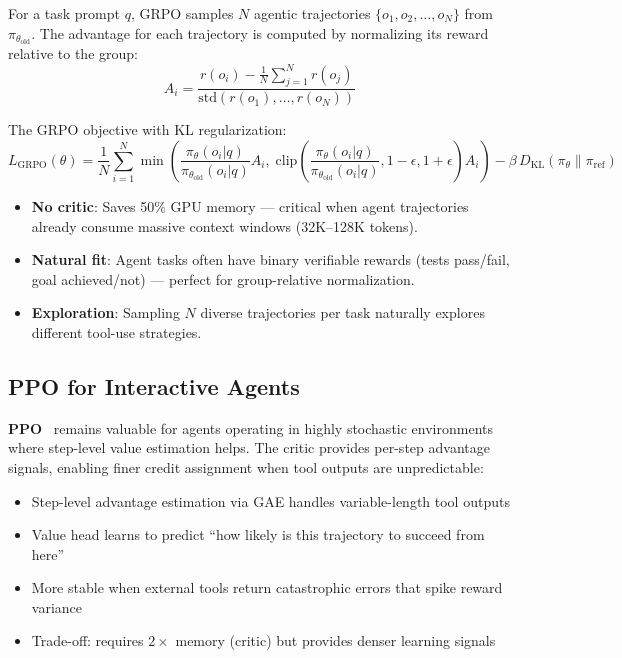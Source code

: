 For a task prompt $q$, GRPO samples $N$ agentic trajectories $\{o_1, o_2, \dots, o_N\}$ from $\pi_{\theta_{\text{old}}}$. The advantage for each trajectory is computed by normalizing its reward relative to the group: 
\begin{equation}
\boxed{A_i = \frac{r(o_i) - \frac{1}{N}\sum_{j=1}^N r(o_j)}{\text{std}(r(o_1), \dots, r(o_N))}}
\end{equation}

The GRPO objective with KL regularization: 
\begin{equation}
L_{\text{GRPO}}(\theta) = \frac{1}{N} \sum_{i=1}^N \min\!\left( \frac{\pi_\theta(o_i|q)}{\pi_{\theta_{\text{old}}}(o_i|q)} A_i,\; \text{clip}\!\left(\frac{\pi_\theta(o_i|q)}{\pi_{\theta_{\text{old}}}(o_i|q)}, 1{-}\epsilon, 1{+}\epsilon\right) A_i \right) - \beta\, D_{\text{KL}}(\pi_\theta \| \pi_{\text{ref}})
\end{equation}

\begin{intuitionbox}
\begin{itemize}
  \item \textbf{No critic}: Saves 50\% GPU memory --- critical when agent trajectories already consume massive context windows (32K--128K tokens).
  \item \textbf{Natural fit}: Agent tasks often have binary verifiable rewards (tests pass/fail, goal achieved/not) --- perfect for group-relative normalization.
  \item \textbf{Exploration}: Sampling $N$ diverse trajectories per task naturally explores different tool-use strategies.
\end{itemize}
\end{intuitionbox}

\subsection{PPO for Interactive Agents}
\label{ppo-for-interactive-agents}

\textbf{PPO}~\cite{schulman2017proximal} remains valuable for agents operating in highly stochastic environments where step-level value estimation helps. The critic provides per-step advantage signals, enabling finer credit assignment when tool outputs are unpredictable:

\begin{itemize}
  \item Step-level advantage estimation via GAE handles variable-length tool outputs
  \item Value head learns to predict ``how likely is this trajectory to succeed from here''
  \item More stable when external tools return catastrophic errors that spike reward variance
  \item Trade-off: requires $2\times$ memory (critic) but provides denser learning signals
\end{itemize}

